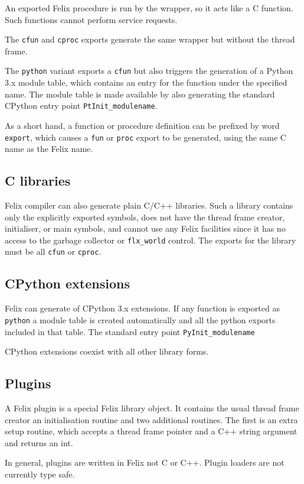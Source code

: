 \documentclass[oneside]{book}
\begin{document}
An exported Felix procedure is run by the wrapper, so it acts like
a C function. Such functions cannot perform service requests.

The \verb$cfun$ and \verb$cproc$ exports generate the same wrapper but
without the thread frame.

The \verb$python$ variant exports a \verb$cfun$ but also triggers the
generation of a Python 3.x module table, which contains an entry for
the function under the specified name. The module table is made
available by also generating the standard CPython entry point 
\verb$PtInit_modulename$.

As a short hand, a function or procedure definition can be prefixed by
word \verb$export$, which causes a \verb$fun$ or \verb$proc$ export to
be generated, using the same C name as the Felix name.

\subsection{C libraries}
Felix compiler can also generate plain C/C++ libraries.
Such a library contains only the explicitly exported symbols,
does not have the thread frame creator, initialiser, or main
symbols, and cannot use any Felix facilities since it has
no access to the garbage collector or \verb$flx_world$ control.
The exports for the library must be all \verb$cfun$ or \verb$cproc$.


\subsection{CPython extensions}
Felix can generate of CPython 3.x extensions.  If any 
function is exported as \verb$python$ a module table is
created automatically and all the python exports included
in that table. The standard entry point \verb$PyInit_modulename$

CPython extensions coexist with all other library forms.

\subsection{Plugins}
A Felix plugin is a special Felix library object.
It contains the usual thread frame creator an initialisation
routine and two additional routines. The first is an extra
setup routine, which accepts a thread frame pointer and a 
C++ string argument and returns an int.

In general, plugins are written in Felix not C or C++.
Plugin loaders are not currently type safe.
\end{document}
